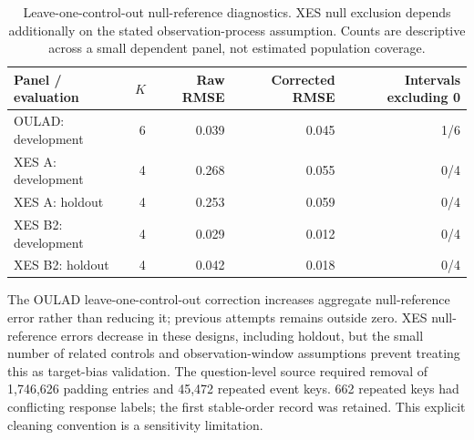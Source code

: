 \begin{table}[htbp]\centering\small
\caption{Leave-one-control-out null-reference diagnostics. XES null exclusion depends additionally on the stated observation-process assumption. Counts are descriptive across a small dependent panel, not estimated population coverage.}\label{tab:pseudo-targets}
\begin{tabularx}{\textwidth}{Xrrrr}\toprule
Panel / evaluation & $K$ & Raw RMSE & Corrected RMSE & Intervals excluding 0 \\\midrule
OULAD: development & 6 & 0.039 & 0.045 & 1/6 \\
XES A: development & 4 & 0.268 & 0.055 & 0/4 \\
XES A: holdout & 4 & 0.253 & 0.059 & 0/4 \\
XES B2: development & 4 & 0.029 & 0.012 & 0/4 \\
XES B2: holdout & 4 & 0.042 & 0.018 & 0/4 \\
\bottomrule\end{tabularx}\end{table}
The OULAD leave-one-control-out correction increases aggregate null-reference error rather than reducing it; previous attempts remains outside zero. XES null-reference errors decrease in these designs, including holdout, but the small number of related controls and observation-window assumptions prevent treating this as target-bias validation.
The question-level source required removal of 1,746,626 padding entries and 45,472 repeated event keys. 662 repeated keys had conflicting response labels; the first stable-order record was retained. This explicit cleaning convention is a sensitivity limitation.